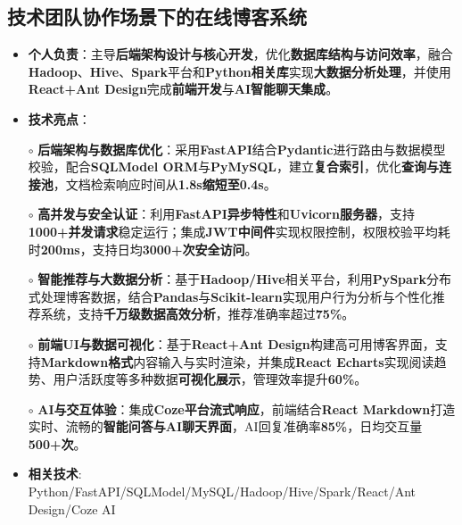 \subsection{\textbf{技术团队协作场景下的在线博客系统} \hspace{2cm}{2025.06 -- 至今}}
  \begin{normalsize}
    \begin{itemize}
  \item \textbf{个人负责}：主导\textbf{后端架构设计与核心开发}，优化\textbf{数据库结构与访问效率}，融合\textbf{Hadoop}、\textbf{Hive}、\textbf{Spark}平台和\textbf{Python相关库}实现\textbf{大数据分析处理}，并使用\textbf{React+Ant Design}完成\textbf{前端开发}与\textbf{AI智能聊天集成}。
    \item \textbf{技术亮点}：
    \setlength{\itemindent}{1em} %
  \item[$\circ$] \textbf{后端架构与数据库优化}：采用\textbf{FastAPI}结合\textbf{Pydantic}进行路由与数据模型校验，配合\textbf{SQLModel ORM}与\textbf{PyMySQL}，建立\textbf{复合索引}，优化\textbf{查询与连接池}，文档检索响应时间从\textbf{1.8s缩短至0.4s}。
  \item[$\circ$] \textbf{高并发与安全认证}：利用\textbf{FastAPI异步特性}和\textbf{Uvicorn服务器}，支持\textbf{1000+并发请求}稳定运行；集成\textbf{JWT中间件}实现权限控制，权限校验平均耗时\textbf{200ms}，支持日均\textbf{3000+次安全访问}。
  \item[$\circ$] \textbf{智能推荐与大数据分析}：基于\textbf{Hadoop/Hive}相关平台，利用\textbf{PySpark}分布式处理博客数据，结合\textbf{Pandas}与\textbf{Scikit-learn}实现用户行为分析与个性化推荐系统，支持\textbf{千万级数据高效分析}，推荐准确率超过\textbf{75\%}。
  \item[$\circ$] \textbf{前端UI与数据可视化}：基于\textbf{React+Ant Design}构建高可用博客界面，支持\textbf{Markdown格式}内容输入与实时渲染，并集成\textbf{React Echarts}实现阅读趋势、用户活跃度等多种数据\textbf{可视化展示}，管理效率提升\textbf{60\%}。
  \item[$\circ$] \textbf{AI与交互体验}：集成\textbf{Coze平台流式响应}，前端结合\textbf{React Markdown}打造实时、流畅的\textbf{智能问答与AI聊天界面}，AI回复准确率\textbf{85\%}，日均交互量\textbf{500+次}。
    \setlength{\itemindent}{0em} %
  \item \textbf{相关技术}: Python/FastAPI/SQLModel/MySQL/Hadoop/Hive/Spark/React/Ant Design/Coze AI
    \end{itemize}
  \end{normalsize}